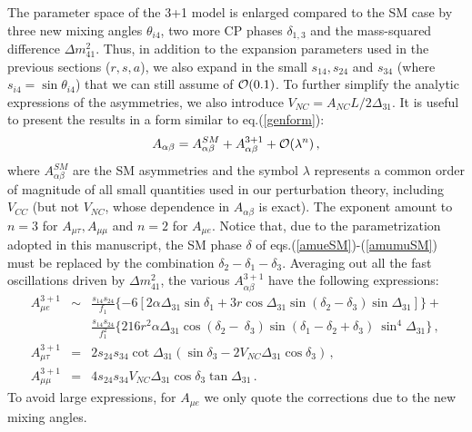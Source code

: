 \documentclass[12pt]{article}
\begin{document}
The  parameter space of the 3+1 model is enlarged compared to the SM case by three new mixing angles $\theta_{i4}$, two more CP phases $\delta_{1,3}$ and the mass-squared difference  $\Delta m^2_{41}$. Thus, in addition to the expansion parameters used in the previous sections ($r,s,a$), we also expand in the small $s_{14},s_{24}$ and $s_{34}$ (where $s_{i4} =\sin \theta_{i4}$) that we can still assume of ${\cal O}(0.1)$. To further simplify the analytic expressions of the asymmetries, we also introduce  $V_{NC} = A_{NC} L/ 2 \Delta_{31}$. It is useful to present the results
 in a form similar to eq.(\ref{genform}):
\begin{equation}
A_{\alpha\beta} =A_{\alpha\beta}^{SM}  +  A_{\alpha\beta}^{3+1} + {\cal O}(\lambda^n) \,,
\end{equation}
where $A_{\alpha\beta}^{SM}$ are the SM asymmetries and the symbol $\lambda$ represents a common order of magnitude of all small quantities used in our perturbation theory, including $V_{CC}$ (but not $V_{NC}$, whose dependence in $A_{\alpha\beta}$ is exact). 
The exponent amount to $n=3$ for $A_{\mu \tau}, A_{\mu \mu}$ and $n=2$ for $A_{\mu e}$.
Notice that, due to the parametrization adopted in this manuscript, the SM phase $\delta$ of eqs.(\ref{amueSM})-(\ref{amumuSM}) must be replaced by the combination $\delta_2-\delta_1-\delta_3$. 
Averaging out all the fast oscillations driven by $\Delta m_{41}^2$, the various $A_{\alpha\beta}^{3+1}$ have the following expressions:
\begin{eqnarray}\nonumber
A_{\mu e}^{3+1} &\sim&\frac{s_{14} s_{24}}{f_1}\{-6 \left[2 \alpha \Delta_{31} \sin\delta_1 +
 3 r \cos\Delta_{31} \sin(\delta_2 - \delta_3) \sin\Delta_{31}\right]\} + \nonumber \\ &&\frac{s_{14}s_{24}}{f_1^2}\{
 216 r^2 \alpha \Delta_{31} \cos(\delta_2 - \
\delta_3) \sin(\delta_1 - \delta_2 + \delta_3) \
\sin^4\Delta_{31}\nonumber\}\,,\\
 A_{\mu \tau}^{3+1} &=& 2 s_{24} s_{34} \cot\Delta_{31} (\sin\delta_3-2 V_{NC} \Delta_{31} \cos\delta_3) \,,\label{3+1asy}\\
A_{\mu \mu}^{3+1} &=& 4 s_{24} s_{34} V_{NC} \Delta_{31} \cos\delta_3 \tan\Delta_{31}\nonumber\,.
\end{eqnarray}
To avoid large expressions, for $A_{\mu e}$ we only quote the corrections due to the new mixing angles.

\end{document}

